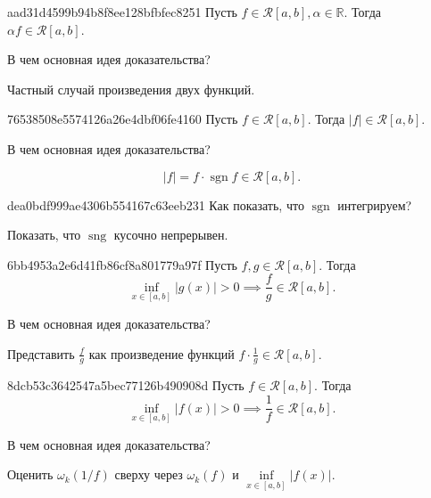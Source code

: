 \begin{note}{aad31d4599b94b8f8ee128bfbfec8251}
    Пусть \({ f \in \mathcal R[a, b], \alpha \in \mathbb R }\). Тогда \({ \alpha f \in \mathcal R[a, b] }\).

    В чем основная идея доказательства?

    \begin{cloze}{1}
        Частный случай произведения двух функций.
    \end{cloze}
\end{note}

\begin{note}{76538508e5574126a26e4dbf06fe4160}
    Пусть \({ f \in \mathcal R[a, b] }\). Тогда \({ \left\lvert f \right\rvert \in \mathcal R[a, b] }\).

    В чем основная идея доказательства?

    \begin{cloze}{1}
        \[
            \left\lvert f \right\rvert = f \cdot \operatorname{sgn} f \in \mathcal R[a, b].
        \]
    \end{cloze}
\end{note}

\begin{note}{dea0bdf999ae4306b554167c63eeb231}
    Как показать, что \({ \operatorname{sgn} }\) интегрируем?

    \begin{cloze}{1}
        Показать, что \({ \operatorname{sng} }\) кусочно непрерывен.
    \end{cloze}
\end{note}

\begin{note}{6bb4953a2e6d41fb86cf8a801779a97f}
    Пусть \({ f, g \in \mathcal R[a, b] }\). Тогда
    \[
        \underset{x \in [a, b]}{\inf} \left\lvert g(x) \right\rvert > 0 \implies \frac{f}{g} \in \mathcal R[a, b].
    \]

    В чем основная идея доказательства?

    \begin{cloze}{1}
        Представить \({ \frac{f}{g} }\) как произведение функций \({ f \cdot \frac{1}{g} \in \mathcal R[a, b] }\).
    \end{cloze}
\end{note}

\begin{note}{8dcb53c3642547a5bec77126b490908d}
    Пусть \({ f \in \mathcal R[a, b] }\). Тогда
    \[
        \underset{x \in [a, b]}{\inf} \left\lvert f(x) \right\rvert > 0 \implies \frac{1}{f} \in \mathcal R[a, b].
    \]

    В чем основная идея доказательства?

    \begin{cloze}{1}
        Оценить \({ \omega_k( 1 / f ) }\) сверху через \({ \omega_k(f) }\) и \({ \underset{x \in [a, b]}{\inf} \left\lvert f(x) \right\rvert     }\).
    \end{cloze}
\end{note}

